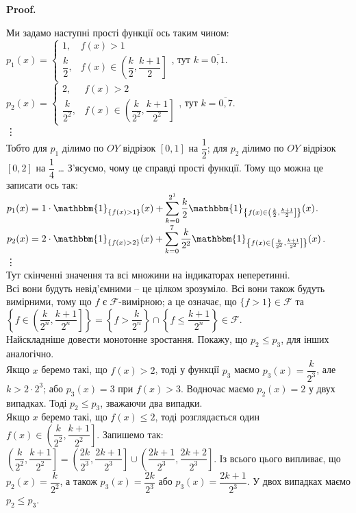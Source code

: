 \documentclass[a4paper, 10pt]{article}
\makeatletter
\theoremstyle{theoremdd}
\renewenvironment{proof}[1][Proof.\\]{\par
\pushQED{\hfill \qed}%
\normalfont \topsep6\p@\@plus6\p@\relax
\trivlist
\item\relax
{\bfseries
#1\@addpunct{.}}\hspace\labelsep\ignorespaces
}{%
\popQED\endtrivlist\@endpefalse
}
\makeatother
\begin{document}
\begin{proof}
Ми задамо наступні прості функції ось таким чином:\\
$p_1(x) = \begin{cases} 1, & f(x) > 1 \\ \dfrac{k}{2}, & f(x) \in \left( \dfrac{k}{2}, \dfrac{k+1}{2} \right] \end{cases}$, тут $k = \overline{0,1}$.\\
$p_2(x) = \begin{cases} 2, & f(x) > 2 \\ \dfrac{k}{2^2}, & f(x) \in \left( \dfrac{k}{2^2}, \dfrac{k+1}{2^2} \right] \end{cases}$, тут $k = \overline{0,7}$.\\
\vdots\\
Тобто для $p_1$ ділимо по $OY$ відрізок $[0,1]$ на $\dfrac{1}{2}$; для $p_2$ ділимо по $OY$ відрізок $[0,2]$ на $\dfrac{1}{4}$ \dots
З'ясуємо, чому це справді прості функції. Тому що можна це записати ось так:\\
$p_1(x) = 1 \cdot \mathbbm{1}_{\{f(x) > 1\}}(x) + \displaystyle\sum_{k=0}^{2^1} \dfrac{k}{2} \mathbbm{1}_{\left\{f(x) \in \left( \frac{k}{2}, \frac{k+1}{2} \right]\right\}}(x)$.\\
$p_2(x) = 2 \cdot \mathbbm{1}_{\{f(x) > 2\}}(x) + \displaystyle\sum_{k=0}^{7} \dfrac{k}{2^2} \mathbbm{1}_{\left\{f(x) \in \left( \frac{k}{2^2}, \frac{k+1}{2^2} \right]\right\}}(x)$.\\
\vdots \\
Тут скінченні значення та всі множини на індикаторах неперетинні.\\
Всі вони будуть невід'ємними -- це цілком зрозуміло. Всі вони також будуть вимірними, тому що $f$ є $\mathcal{F}$-вимірною; а це означає, що $\{f > 1\} \in \mathcal{F}$ та $\left\{ f \in \left( \dfrac{k}{2^n}, \dfrac{k+1}{2^{n}} \right] \right\} = \left\{ f > \dfrac{k}{2^n} \right\} \cap \left\{f \leq \dfrac{k+1}{2^n} \right\} \in \mathcal{F}$.\\
Найскладніше довести монотонне зростання. Покажу, що $p_2 \leq p_3$, для інших аналогічно.\\
Якщо $x$ беремо такі, що $f(x) > 2$, тоді у функції $p_3$ маємо $p_3(x) = \dfrac{k}{2^3}$, але $k > 2 \cdot 2^3$; або $p_3(x) = 3$ при $f(x) > 3$. Водночас маємо $p_2(x) = 2$ у двух випадках. Тоді $p_2 \leq p_3$, зважаючи два випадки.\\
Якщо $x$ беремо такі, що $f(x) \leq 2$, тоді розглядається один $f(x) \in \left( \dfrac{k}{2^2}, \dfrac{k+1}{2^2} \right]$. Запишемо так: $\left( \dfrac{k}{2^2}, \dfrac{k+1}{2^2} \right] = \left( \dfrac{2k}{2^3}, \dfrac{2k+1}{2^3} \right] \cup \left( \dfrac{2k+1}{2^3}, \dfrac{2k+2}{2^3} \right]$. Із всього цього випливає, що $p_2(x) = \dfrac{k}{2^2}$, а також $p_3(x) = \dfrac{2k}{2^3}$ або $p_3(x) = \dfrac{2k+1}{2^3}$. У двох випадках маємо $p_2 \leq p_3$.\\

\end{proof}
\end{document}
